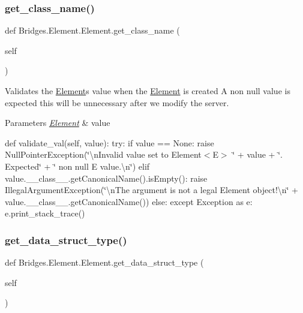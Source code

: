 \subsubsection{\texorpdfstring{get\+\_\+class\+\_\+name()}{get\_class\_name()}}
{\footnotesize\ttfamily def Bridges.\+Element.\+Element.\+get\+\_\+class\+\_\+name (\begin{DoxyParamCaption}\item[{}]{self }\end{DoxyParamCaption})}



Validates the \mbox{\hyperlink{class_bridges_1_1_element_1_1_element}{Element}}\textquotesingle{}s value when the \mbox{\hyperlink{class_bridges_1_1_element_1_1_element}{Element}} is created A non null value is expected this will be unnecessary after we modify the server. 


\begin{DoxyParams}{Parameters}
{\em \mbox{\hyperlink{class_bridges_1_1_element_1_1_element}{Element}}} & value\\
\hline
\end{DoxyParams}
def validate\+\_\+val(self, value)\+: try\+: if value == None\+: raise Null\+Pointer\+Exception(\char`\"{}\textbackslash{}n\+Invalid value set to Element$<$\+E$>$ \textquotesingle{}\char`\"{} + value + \char`\"{}\textquotesingle{}. Expected\char`\"{} + \char`\"{} non null E value.\textbackslash{}n\char`\"{}) elif value.\+\_\+\+\_\+class\+\_\+\+\_\+.\+get\+Canonical\+Name().is\+Empty()\+: raise Illegal\+Argument\+Exception(\char`\"{}\textbackslash{}n\+The argument is not a legal Element object!\textbackslash{}n\char`\"{} + value.\+\_\+\+\_\+class\+\_\+\+\_\+.\+get\+Canonical\+Name()) else\+: except Exception as e\+: e.\+print\+\_\+stack\+\_\+trace() \mbox{\label{class_bridges_1_1_element_1_1_element_a3e2a72a74d5cab317aede86b226a4a49}} 
\subsubsection{\texorpdfstring{get\+\_\+data\+\_\+struct\+\_\+type()}{get\_data\_struct\_type()}}
{\footnotesize\ttfamily def Bridges.\+Element.\+Element.\+get\+\_\+data\+\_\+struct\+\_\+type (\begin{DoxyParamCaption}\item[{}]{self }\end{DoxyParamCaption})}


